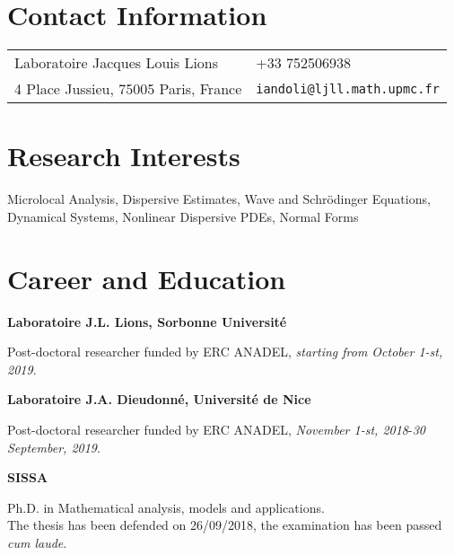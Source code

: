 \documentclass[margin,line,pifont,palatino,courier]{res}
\newenvironment{list1}{
  \begin{list}{\ding{113}}{%
      \setlength{\itemsep}{0in}
      \setlength{\parsep}{0in} \setlength{\parskip}{0in}
      \setlength{\topsep}{0in} \setlength{\partopsep}{0in}
      \setlength{\leftmargin}{0.17in}}}{\end{list}}
\begin{document}

\begin{resume}

\section{\sc Contact Information}

\vspace{.05in}
\begin{tabular}{@{}p{2.75in}p{2in}}
Laboratoire Jacques Louis Lions & +33 752506938 \\
  4 Place Jussieu, 75005 Paris, France                  & \verb+iandoli@ljll.math.upmc.fr+\\
                       \end{tabular}

\section{\sc Research Interests}
Microlocal Analysis, Dispersive Estimates, Wave and Schr\"odinger Equations, Dynamical Systems, Nonlinear Dispersive PDEs, Normal Forms

\section{\sc Career and Education}

{\bf Laboratoire J.L. Lions, Sorbonne Universit\'e}\\
\vspace*{-.1in}
\begin{list1}
\item[] Post-doctoral researcher funded by {ERC ANADEL}, \emph{starting from October 1-st, 2019}.
\end{list1}


{\bf Laboratoire J.A. Dieudonn\'e, Universit\'e de Nice }\\
\vspace*{-.1in}
\begin{list1}
\item[] Post-doctoral researcher funded by {ERC ANADEL},  \emph{November 1-st, 2018}-\emph{30 September, 2019}.
\end{list1}

{\bf SISSA}\\
\vspace*{-.1in}
\begin{list1}
\item[] Ph.D. in Mathematical analysis, models and applications.\\
The thesis has been defended on 26/09/2018, the examination has been passed \emph{cum laude}. 


\end{list1}
\end{resume}
\end{document}

